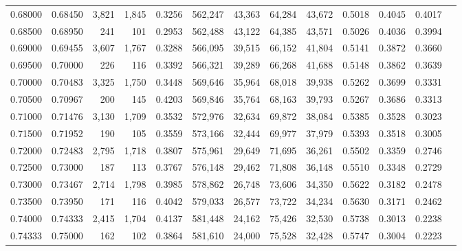 \begin{tabular}{rrrrrrrrrrrrr}
0.68000 & 0.68450 &  3,821 & 1,845 &                                     0.3256 & 562,247 &  43,363 &  64,284 &  43,672 & 0.5018 & 0.4045 & 0.4017 \\
0.68500 & 0.68950 &    241 &   101 &                                     0.2953 & 562,488 &  43,122 &  64,385 &  43,571 & 0.5026 & 0.4036 & 0.3994 \\
0.69000 & 0.69455 &  3,607 & 1,767 &                                     0.3288 & 566,095 &  39,515 &  66,152 &  41,804 & 0.5141 & 0.3872 & 0.3660 \\
0.69500 & 0.70000 &    226 &   116 &                                     0.3392 & 566,321 &  39,289 &  66,268 &  41,688 & 0.5148 & 0.3862 & 0.3639 \\
0.70000 & 0.70483 &  3,325 & 1,750 &                                     0.3448 & 569,646 &  35,964 &  68,018 &  39,938 & 0.5262 & 0.3699 & 0.3331 \\
0.70500 & 0.70967 &    200 &   145 &                                     0.4203 & 569,846 &  35,764 &  68,163 &  39,793 & 0.5267 & 0.3686 & 0.3313 \\
0.71000 & 0.71476 &  3,130 & 1,709 &                                     0.3532 & 572,976 &  32,634 &  69,872 &  38,084 & 0.5385 & 0.3528 & 0.3023 \\
0.71500 & 0.71952 &    190 &   105 &                                     0.3559 & 573,166 &  32,444 &  69,977 &  37,979 & 0.5393 & 0.3518 & 0.3005 \\
0.72000 & 0.72483 &  2,795 & 1,718 &                                     0.3807 & 575,961 &  29,649 &  71,695 &  36,261 & 0.5502 & 0.3359 & 0.2746 \\
0.72500 & 0.73000 &    187 &   113 &                                     0.3767 & 576,148 &  29,462 &  71,808 &  36,148 & 0.5510 & 0.3348 & 0.2729 \\
0.73000 & 0.73467 &  2,714 & 1,798 &                                     0.3985 & 578,862 &  26,748 &  73,606 &  34,350 & 0.5622 & 0.3182 & 0.2478 \\
0.73500 & 0.73950 &    171 &   116 &                                     0.4042 & 579,033 &  26,577 &  73,722 &  34,234 & 0.5630 & 0.3171 & 0.2462 \\
0.74000 & 0.74333 &  2,415 & 1,704 &                                     0.4137 & 581,448 &  24,162 &  75,426 &  32,530 & 0.5738 & 0.3013 & 0.2238 \\
0.74333 & 0.75000 &    162 &   102 &                                     0.3864 & 581,610 &  24,000 &  75,528 &  32,428 & 0.5747 & 0.3004 & 0.2223 \\

\end{tabular}
